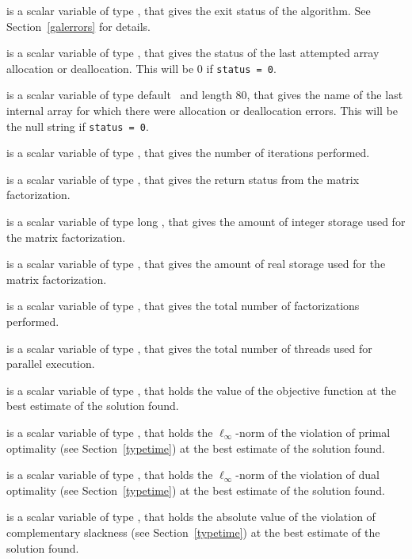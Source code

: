 \begin{description}

 is a scalar variable of type \integer, that gives the
exit status of the algorithm.
See Section~\ref{galerrors}
for details.

 is a scalar variable of type \integer, that gives
the status of the last attempted array allocation or deallocation.
This will be 0 if {\tt status = 0}.

 is a scalar variable of type default \character\
and length 80, that  gives the name of the last internal array
for which there were allocation or deallocation errors.
This will be the null string if {\tt status = 0}.

 is a scalar variable of type \integer, that
gives the number of iterations performed.

 is a scalar variable of type \integer, that
gives the return status from the matrix factorization.

 is a scalar variable of type long
\integer, that gives the amount of integer storage used for the matrix
factorization.

 is a scalar variable of type \longinteger,
that gives the amount of real storage used for the matrix factorization.

 is a scalar variable of type \integer, that gives the
total number of factorizations performed.

 is a scalar variable of type \integer, that gives the
total number of threads used for parallel execution.

 is a scalar variable of type \realdp, that holds the
value of the objective function at the best estimate of the solution found.

 is a scalar variable of type \realdp,
that holds the $\ell_{\infty}$-norm of the violation of primal optimality
(see Section~\ref{typetime}) at the best estimate of the solution found.

 is a scalar variable of type \realdp,
that holds the $\ell_{\infty}$-norm of the violation of dual optimality
(see Section~\ref{typetime}) at the best estimate of the solution found.

is a scalar variable of type \realdp,
that holds the absolute value of the violation of complementary slackness
(see Section~\ref{typetime}) at the best estimate of the solution found.


\end{description}
